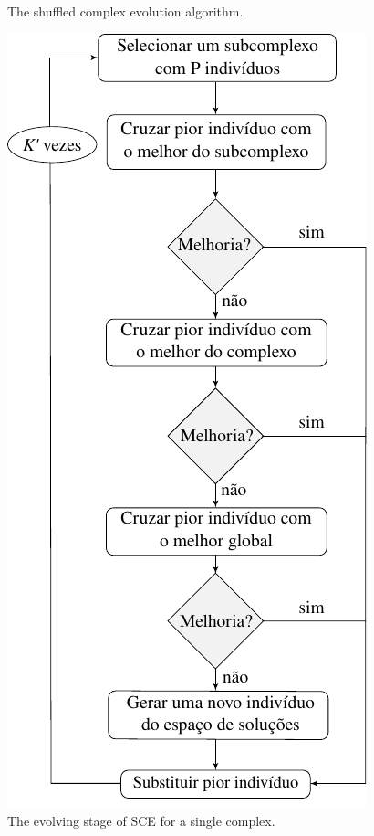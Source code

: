 \begin{figure}[]
\begin{minipage}[b]{0.42\textwidth}
    \caption{The shuffled complex evolution algorithm.}
    \label{img:flow1}
  \end{minipage}
  \hfill
  \begin{minipage}[b]{0.42\textwidth}
    \includegraphics[width=\textwidth]{img/sce/flow2}
    \caption{The evolving stage of SCE for a single complex.}
    \label{img:flow2}
  \end{minipage}
\end{figure}

